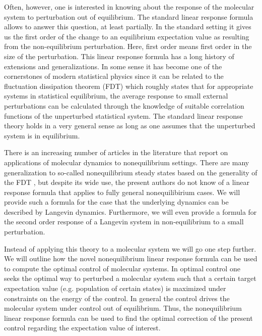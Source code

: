 \documentclass[]{tMPH2e}
\begin{document}
Often, however, one is interested in knowing about the response of the molecular system to perturbation out of equilibrium. The standard linear response formula allows to answer this question, at least partially. In the standard setting it gives us the first order of the change to an equilibrium expectation value as resulting from the non-equilibrium perturbation. Here, first order means first order in the size of the perturbation. This linear response formula has a long history of extensions and generalizations. In some sense it has become one of the cornerstones of modern statistical physics since it can be related to the fluctuation dissipation theorem (FDT) which roughly states that for appropriate systems in statistical equilibrium, the average response to small external perturbations can be calculated through the knowledge of suitable correlation functions of the unperturbed statistical system. The standard linear response theory holds in a  very general sense \cite{HairerMajda} as long as one assumes that the unperturbed system is in equilibrium.

There is an increasing number of articles in the literature that report on applications of molecular dynamics to nonequilibrium settings. There are many generalization to so-called nonequilibrium steady states based on the generality of the FDT \cite{Seifert}, but despite its wide use, the present authors do not know of a linear response formula that applies to fully general nonequilibirium cases. We will provide such a formula for the case that the underlying dynamics can be described by Langevin dynamics. Furthermore, we will even provide a formula for the second order response of a Langevin system in non-equilibrium to a small perturbation.

Instead of applying this theory to a molecular system we will go one step further. We will outline how the novel nonequilibrium linear response formula can be used to compute the optimal control of molecular systems. In optimal control one seeks the optimal way to perturbed a molecular system such that a certain target expectation value (e.g. population of certain states) is maximized under constraints on the energy of the control. In general the control drives the molecular system under control out of equilibrium. Thus, the nonequilibrium linear response formula can be used to find the optimal correction of the present control regarding the expectation value of interest. 
\end{document}
